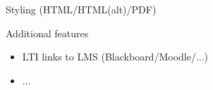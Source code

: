 \begin{frame}[t]{Styling (HTML/HTML(alt)/PDF)}
  
\begin{center}

\end{center}

\end{frame}


\begin{frame}[t]{Additional features}

  \begin{itemize}
  \item LTI links to LMS (Blackboard/Moodle/...)
  \item ...
  \end{itemize}

\end{frame}


